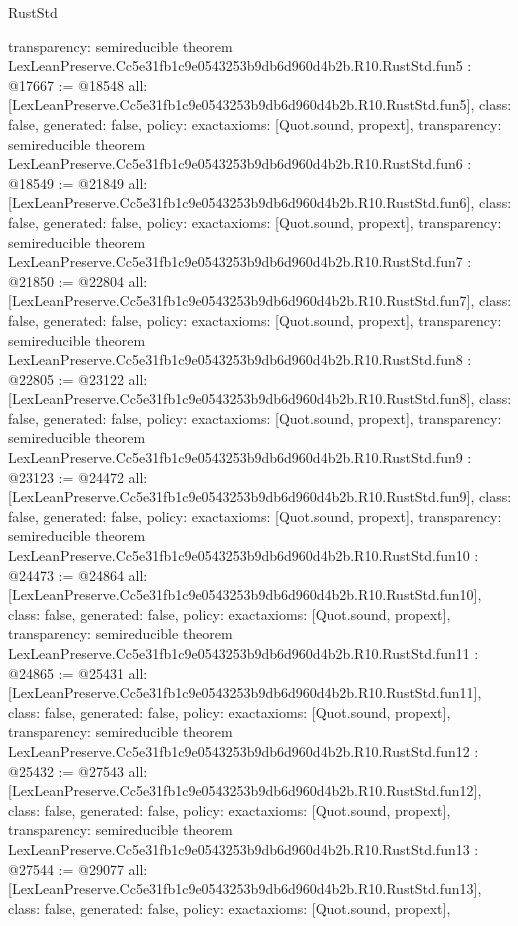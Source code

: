 \begin{lexlean}{RustStd}
\begin{coremodule}
{  transparency: semireducible
}
theorem LexLeanPreserve.Cc5e31fb1c9e0543253b9db6d960d4b2b.R10.RustStd.fun5 : @17667 := @18548 {
  all: [LexLeanPreserve.Cc5e31fb1c9e0543253b9db6d960d4b2b.R10.RustStd.fun5],
  class: false,
  generated: false,
  policy: exact{axioms: [Quot.sound, propext]},
  transparency: semireducible
}
theorem LexLeanPreserve.Cc5e31fb1c9e0543253b9db6d960d4b2b.R10.RustStd.fun6 : @18549 := @21849 {
  all: [LexLeanPreserve.Cc5e31fb1c9e0543253b9db6d960d4b2b.R10.RustStd.fun6],
  class: false,
  generated: false,
  policy: exact{axioms: [Quot.sound, propext]},
  transparency: semireducible
}
theorem LexLeanPreserve.Cc5e31fb1c9e0543253b9db6d960d4b2b.R10.RustStd.fun7 : @21850 := @22804 {
  all: [LexLeanPreserve.Cc5e31fb1c9e0543253b9db6d960d4b2b.R10.RustStd.fun7],
  class: false,
  generated: false,
  policy: exact{axioms: [Quot.sound, propext]},
  transparency: semireducible
}
theorem LexLeanPreserve.Cc5e31fb1c9e0543253b9db6d960d4b2b.R10.RustStd.fun8 : @22805 := @23122 {
  all: [LexLeanPreserve.Cc5e31fb1c9e0543253b9db6d960d4b2b.R10.RustStd.fun8],
  class: false,
  generated: false,
  policy: exact{axioms: [Quot.sound, propext]},
  transparency: semireducible
}
theorem LexLeanPreserve.Cc5e31fb1c9e0543253b9db6d960d4b2b.R10.RustStd.fun9 : @23123 := @24472 {
  all: [LexLeanPreserve.Cc5e31fb1c9e0543253b9db6d960d4b2b.R10.RustStd.fun9],
  class: false,
  generated: false,
  policy: exact{axioms: [Quot.sound, propext]},
  transparency: semireducible
}
theorem LexLeanPreserve.Cc5e31fb1c9e0543253b9db6d960d4b2b.R10.RustStd.fun10 : @24473 := @24864 {
  all: [LexLeanPreserve.Cc5e31fb1c9e0543253b9db6d960d4b2b.R10.RustStd.fun10],
  class: false,
  generated: false,
  policy: exact{axioms: [Quot.sound, propext]},
  transparency: semireducible
}
theorem LexLeanPreserve.Cc5e31fb1c9e0543253b9db6d960d4b2b.R10.RustStd.fun11 : @24865 := @25431 {
  all: [LexLeanPreserve.Cc5e31fb1c9e0543253b9db6d960d4b2b.R10.RustStd.fun11],
  class: false,
  generated: false,
  policy: exact{axioms: [Quot.sound, propext]},
  transparency: semireducible
}
theorem LexLeanPreserve.Cc5e31fb1c9e0543253b9db6d960d4b2b.R10.RustStd.fun12 : @25432 := @27543 {
  all: [LexLeanPreserve.Cc5e31fb1c9e0543253b9db6d960d4b2b.R10.RustStd.fun12],
  class: false,
  generated: false,
  policy: exact{axioms: [Quot.sound, propext]},
  transparency: semireducible
}
theorem LexLeanPreserve.Cc5e31fb1c9e0543253b9db6d960d4b2b.R10.RustStd.fun13 : @27544 := @29077 {
  all: [LexLeanPreserve.Cc5e31fb1c9e0543253b9db6d960d4b2b.R10.RustStd.fun13],
  class: false,
  generated: false,
  policy: exact{axioms: [Quot.sound, propext]},
}
\end{coremodule}
\end{lexlean}
